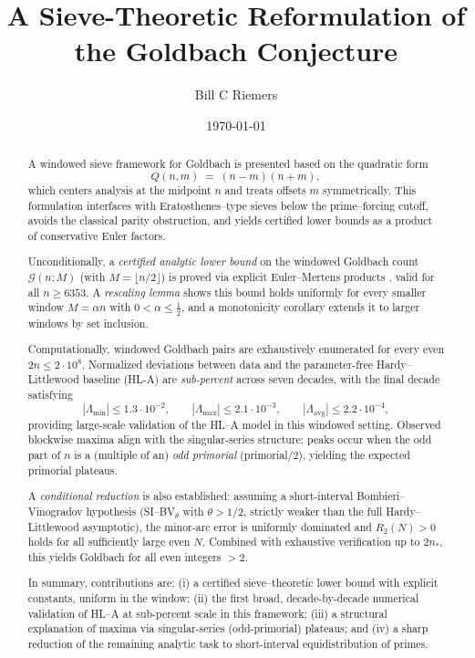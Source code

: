 \documentclass[11pt]{article}
\title{A Sieve-Theoretic Reformulation of the Goldbach Conjecture}
\author{Bill C Riemers}
\date{\today}
\theoremstyle{inline}
\theoremstyle{break}
\theoremstyle{break}
\theoremstyle{break}
\theoremstyle{break}
\theoremstyle{break}
\theoremstyle{break}
\theoremstyle{break}
\theoremstyle{inline}
\newcommand{\xMertens}{6353} %
\newcommand{\xLambdaMinLimit}{1.3\cdot 10^{-2}} %
\newcommand{\xLambdaMaxLimit}{2.1\cdot 10^{-3}} %
\newcommand{\xLambdaAvgLimit}{2.2\cdot 10^{-4}} %
\newcommand{\tavg}{{\scriptscriptstyle\mathrm{avg}}}
\begin{document}
\maketitle

\begin{abstract}
A windowed sieve framework for Goldbach is presented based on the quadratic form
\begin{equation}
Q(n,m)\;=\;(n-m)(n+m),
\end{equation}
which centers analysis at the midpoint \(n\) and treats offsets \(m\) symmetrically. This formulation interfaces with Eratosthenes–type sieves below the prime–forcing cutoff, avoids the classical parity obstruction, and yields certified lower bounds as a product of conservative Euler factors.

Unconditionally, a \emph{certified analytic lower bound} on the windowed Goldbach count \(\mathcal{G}(n;M)\) (with \(M=\lfloor n/2\rfloor\)) is proved via explicit Euler–Mertens products \cite{Mertens1874,MontgomeryVaughan2007,RosserSchoenfeld1962,Dusart2010}, valid for all \(n\ge \xMertens\). A \emph{rescaling lemma} shows this bound holds uniformly for every smaller window \(M=\alpha n\) with \(0<\alpha\le \tfrac12\), and a monotonicity corollary extends it to larger windows by set inclusion.

Computationally, windowed Goldbach pairs are exhaustively enumerated for every even \(2n\le 2\cdot 10^8\). Normalized deviations between data and the parameter-free Hardy–Littlewood baseline (HL-A) \cite{HardyLittlewood1923} are \emph{sub-percent} across seven decades, with the final decade satisfying
\begin{equation}
|\Lambda_{\min}|\le \xLambdaMinLimit,\qquad
|\Lambda_{\max}|\le \xLambdaMaxLimit,\qquad
|\Lambda_{\tavg}|\le \xLambdaAvgLimit,
\end{equation}
providing large-scale validation of the HL–A model in this windowed setting. Observed blockwise maxima align with the singular-series structure: peaks occur when the odd part of \(n\) is a (multiple of an) \emph{odd primorial} (primorial/2), yielding the expected primorial plateaus.

A \emph{conditional reduction} is also established: assuming a short-interval Bombieri–Vinogradov hypothesis (SI–BV\(_\theta\) with \(\theta>1/2\), strictly weaker than the full Hardy–Littlewood asymptotic), the minor-arc error is uniformly dominated and \(R_2(N)>0\) holds for all sufficiently large even \(N\). Combined with exhaustive verification up to \(2n_\ast\), this yields Goldbach for all even integers \(>2\).

In summary, contributions are: (i) a certified sieve–theoretic lower bound with explicit constants, uniform in the window; (ii) the first broad, decade-by-decade numerical validation of HL–A at sub-percent scale in this framework; (iii) a structural explanation of maxima via singular-series (odd-primorial) plateaus; and (iv) a sharp reduction of the remaining analytic task to short-interval equidistribution of primes.
\end{abstract}
\end{document}
